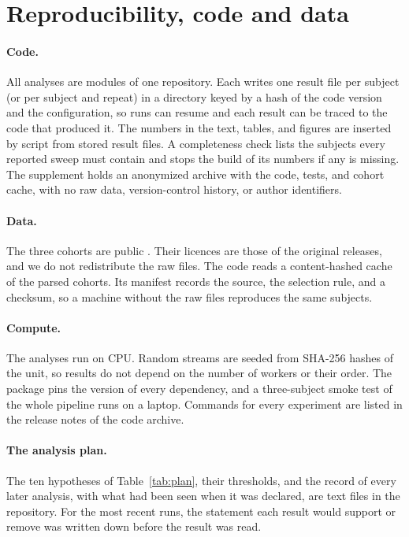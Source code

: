 \section{Reproducibility, code and data}
\label{app:reproducibility}

\paragraph{Code.}
All analyses are modules of one repository. Each writes one result file per subject (or per subject and repeat) in a
directory keyed by a hash of the code version and the configuration, so runs can resume and each result can be traced to
the code that produced it. The numbers in the text, tables, and figures are inserted by script from stored result files.
A completeness check lists the subjects every reported sweep must contain and stops the build of its numbers if any is
missing. The supplement holds an anonymized archive with the code, tests, and cohort cache, with no raw data,
version-control history, or author identifiers.

\paragraph{Data.}
The three cohorts are public \citep{das2025cgmacros,zhao2023shanghai,hall2018glucotypes}. Their licences are those of
the original releases, and we do not redistribute the raw files. The code reads a content-hashed cache of the parsed
cohorts. Its manifest records the source, the selection rule, and a checksum, so a machine without the raw files
reproduces the same subjects.

\paragraph{Compute.}
The analyses run on CPU. Random streams are seeded from SHA-256 hashes of the unit, so results do not depend on the number
of workers or their order. The package pins the version of every dependency, and a three-subject smoke test of the whole
pipeline runs on a laptop. Commands for every experiment are listed in the release notes of the code archive.

\paragraph{The analysis plan.}
The ten hypotheses of Table~\ref{tab:plan}, their thresholds, and the record of every later analysis, with what had been
seen when it was declared, are text files in the repository. For the most recent runs, the statement each result would
support or remove was written down before the result was read.
